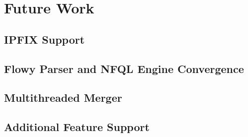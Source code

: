 \chapter{Future Work}\label{ch:future-work}

\section{IPFIX Support}\label{sec:ipfix-support}
\section{Flowy Parser and NFQL Engine Convergence}\label{sec:ipfix-support}
\section{Multithreaded Merger}\label{sec:multithreaded-merger}
\section{Additional Feature Support}\label{sec:multithreaded-merger}
